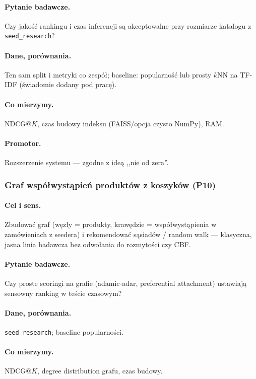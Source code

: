 \documentclass[a4paper,11pt]{article}
\begin{document}
\paragraph{Pytanie badawcze.}
Czy jakość rankingu i czas inferencji są akceptowalne przy rozmiarze katalogu z \texttt{seed\_research}?

\paragraph{Dane, porównania.}
Ten sam split i metryki co zespół; baseline: popularność lub prosty $k$NN na TF-IDF (świadomie dodany pod pracę).

\paragraph{Co mierzymy.}
NDCG@$K$, czas budowy indeksu (FAISS/opcja czysto NumPy), RAM.

\paragraph{Promotor.}
Rozszerzenie systemu --- zgodne z ideą ,,nie od zera''.

\subsubsection{Graf współwystąpień produktów z koszyków (\textbf{P10})}

\paragraph{Cel i sens.}
Zbudować graf (węzły = produkty, krawędzie = współwystąpienia w zamówieniach z seedera) i rekomendować sąsiadów / random walk --- klasyczna, jasna linia badawcza bez odwołania do rozmytości czy CBF.

\paragraph{Pytanie badawcze.}
Czy proste scoringi na grafie (adamic-adar, preferential attachment) ustawiają sensowny ranking w teście czasowym?

\paragraph{Dane, porównania.}
\texttt{seed\_research}; baseline popularności.

\paragraph{Co mierzymy.}
NDCG@$K$, degree distribution grafu, czas budowy.
\end{document}
